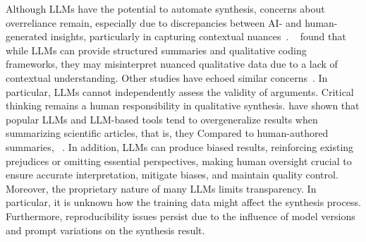 Although LLMs have the potential to automate synthesis, concerns about overreliance remain, especially due to discrepancies between AI- and human-generated insights, particularly in capturing contextual nuances~\cite{bano2023exploringqualitativeresearchusing}.
\citeauthor{bano2023exploringqualitativeresearchusing}~\cite{bano2023exploringqualitativeresearchusing} found that while LLMs can provide structured summaries and qualitative coding frameworks, they may misinterpret nuanced qualitative data due to a lack of contextual understanding.
Other studies have echoed similar concerns~\cite{DBLP:journals/ase/BanoHZT24, barros2024largelanguagemodelqualitative, leça2024applicationsimplicationslargelanguage}.
In particular, LLMs cannot independently assess the validity of arguments.
Critical thinking remains a human responsibility in qualitative synthesis.
\citeauthor{peterschineyee2025generalizationbias} have shown that popular LLMs and LLM-based tools tend to overgeneralize results when summarizing scientific articles, that is, they 
Compared to human-authored summaries, ~\cite{peterschineyee2025generalizationbias}.
In addition, LLMs can produce biased results, reinforcing existing prejudices or omitting essential perspectives, making human oversight crucial to ensure accurate interpretation, mitigate biases, and maintain quality control.
Moreover, the proprietary nature of many LLMs limits transparency.
In particular, it is unknown how the training data might affect the synthesis process.
Furthermore, reproducibility issues persist due to the influence of model versions and prompt variations on the synthesis result.


\label{sec:llms-as-subjects}


